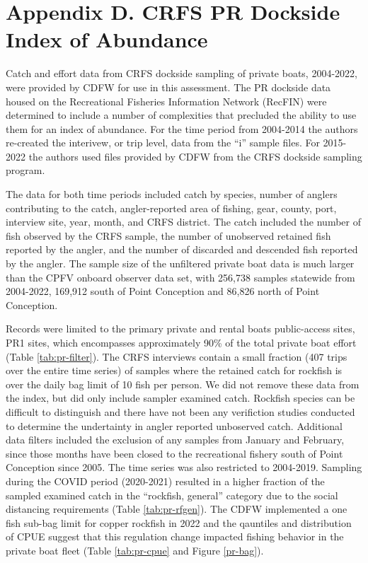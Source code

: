 \documentclass[11pt,
  english,
  letterpaper,
]{article}
\begin{document}
\newcommand{\lt}{\ensuremath <}
\newcommand{\gt}{\ensuremath >}

\linenumbers

\newcommand\CapeM{$40^\circ 10^\prime N$}
\newcommand\PtC{$34^\circ 27^\prime N$}
\newcommand\CAOR{$42^\circ 00^\prime N$}

\hypertarget{crfs-pr-index}{%
\section{Appendix D. CRFS PR Dockside Index of Abundance}\label{crfs-pr-index}}

Catch and effort data from CRFS dockside sampling of private boats, 2004-2022, were provided by CDFW for use in this assessment. The PR dockside data housed on the Recreational Fisheries Information Network (RecFIN) were determined to include a number of complexities that precluded the ability to use them for an index of abundance. For the time period from 2004-2014 the authors re-created the interivew, or trip level, data from the ``i'' sample files. For 2015-2022 the authors used files provided by CDFW from the CRFS dockside sampling program.

The data for both time periods included catch by species, number of anglers contributing to the catch, angler-reported area of fishing, gear, county, port, interview site, year, month, and CRFS district. The catch included the number of fish observed by the CRFS sample, the number of unobserved retained fish reported by the angler, and the number of discarded and descended fish reported by the angler. The sample size of the unfiltered private boat data is much larger than the CPFV onboard observer data set, with 256,738 samples statewide from 2004-2022, 169,912 south of Point Conception and 86,826 north of Point Conception.

Records were limited to the primary private and rental boats public-access sites, PR1 sites, which encompasses approximately 90\% of the total private boat effort (Table \ref{tab:pr-filter}). The CRFS interviews contain a small fraction (407 trips over the entire time series) of samples where the retained catch for rockfish is over the daily bag limit of 10 fish per person. We did not remove these data from the index, but did only include sampler examined catch. Rockfish species can be difficult to distinguish and there have not been any verifiction studies conducted to determine the undertainty in angler reported unboserved catch. Additional data filters included the exclusion of any samples from January and February, since those months have been closed to the recreational fishery south of Point Conception since 2005. The time series was also restricted to 2004-2019. Sampling during the COVID period (2020-2021) resulted in a higher fraction of the sampled examined catch in the ``rockfish, general'' category due to the social distancing requirements (Table \ref{tab:pr-rfgen}). The CDFW implemented a one fish sub-bag limit for copper rockfish in 2022 and the qauntiles and distribution of CPUE suggest that this regulation change impacted fishing behavior in the private boat fleet (Table \ref{tab:pr-cpue} and Figure \ref{pr-bag}).
\end{document}
